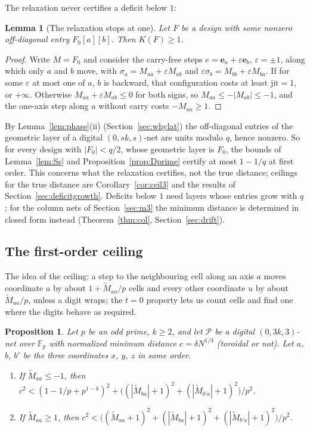 \documentclass[11pt]{amsart}
\newtheorem{proposition}[theorem]{Proposition}
\newtheorem{lemma}[theorem]{Lemma}
\theoremstyle{definition}
\theoremstyle{plain}
\newcommand{\F}{\mathbb{F}}
\newcommand{\e}{\mathbf{e}}
\begin{document}
The relaxation never certifies a deficit below $1$:

\begin{lemma}[The relaxation stops at one]\label{lem:Kone}
Let $F$ be a design with some nonzero off-diagonal entry $F_0[a][b]$. Then $K(F)\ge1$.
\end{lemma}

\begin{proof}
Write $M=F_0$ and consider the carry-free steps $e=\e_a+\varepsilon\e_b$, $\varepsilon=\pm1$, along which only $a$ and $b$ move, with $\sigma_a=M_{aa}+\varepsilon M_{ab}$ and $\varepsilon\sigma_b=M_{bb}+\varepsilon M_{ba}$. If for some $\varepsilon$ at most one of $a$, $b$ is backward, that configuration costs at least $\mathrm{jit}=1$, or $+\infty$. Otherwise $M_{aa}+\varepsilon M_{ab}\le0$ for both signs, so $M_{aa}\le-|M_{ab}|\le-1$, and the one-axis step along $a$ without carry costs $-M_{aa}\ge1$.
\end{proof}

By Lemma~\ref{lem:phase}(ii) (Section~\ref{sec:whylat}) the off-diagonal entries of the geometric layer of a digital $(0,sk,s)$-net are units modulo $q$, hence nonzero. So for every design with $|F_0|<q/2$, whose geometric layer is $F_0$, the bounds of Lemma~\ref{lem:Ss} and Proposition~\ref{prop:Dprime} certify at most $1-1/q$ at first order. This concerns what the relaxation certifies, not the true distance; ceilings for the true distance are Corollary~\ref{cor:ceil3} and the results of Section~\ref{sec:deficitgrowth}. Deficits below $1$ need layers whose entries grow with $q$; for the column nets of Section~\ref{sec:m3} the minimum distance is determined in closed form instead (Theorem~\ref{thm:col}, Section~\ref{sec:drift}).

\subsection{The first-order ceiling}\label{sec:ceil}
The idea of the ceiling: a step to the neighbouring cell along an axis $a$ moves coordinate $a$ by about $1+\tilde M_{aa}/p$ cells and every other coordinate $u$ by about $\tilde M_{ua}/p$, unless a digit wraps; the $t=0$ property lets us count cells and find one where the digits behave as required.

\begin{proposition}\label{prop:ceil}
Let $p$ be an odd prime, $k\ge2$, and let $\mathcal P$ be a digital $(0,3k,3)$-net over $\F_p$ with normalized minimum distance $c=\delta N^{1/3}$ (toroidal or not). Let $a$, $b$, $b'$ be the three coordinates $x$, $y$, $z$ in some order.
\begin{enumerate}
\item[(i)] If $\tilde M_{aa}\le-1$, then $c^2<(1-1/p+p^{1-k})^2+\bigl((|\tilde M_{ba}|+1)^2+(|\tilde M_{b'a}|+1)^2\bigr)/p^2$.
\item[(ii)] If $\tilde M_{aa}\ge1$, then $c^2<\bigl((\tilde M_{aa}+1)^2+(|\tilde M_{ba}|+1)^2+(|\tilde M_{b'a}|+1)^2\bigr)/p^2$.
\end{enumerate}
\end{proposition}
\end{document}

